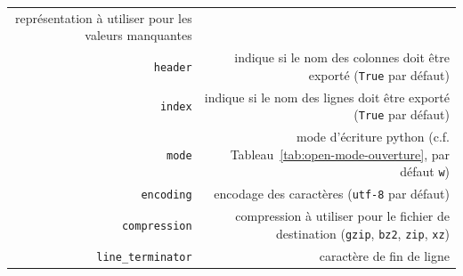 \documentclass[12pt,]{book}
\numberwithin{equation}{section}
\numberwithin{countremarque}{section}
\begin{document}
\begin{longtable}[]{@{}rr@{}}
\begin{minipage}[t]{0.67\columnwidth}
représentation à utiliser pour les valeurs manquantes\strut
\end{minipage}\tabularnewline
\begin{minipage}[t]{0.22\columnwidth}\raggedleft\strut
\texttt{header}\strut
\end{minipage} & \begin{minipage}[t]{0.67\columnwidth}\raggedleft\strut
indique si le nom des colonnes doit être exporté (\texttt{True} par
défaut)\strut
\end{minipage}\tabularnewline
\begin{minipage}[t]{0.22\columnwidth}\raggedleft\strut
\texttt{index}\strut
\end{minipage} & \begin{minipage}[t]{0.67\columnwidth}\raggedleft\strut
indique si le nom des lignes doit être exporté (\texttt{True} par
défaut)\strut
\end{minipage}\tabularnewline
\begin{minipage}[t]{0.22\columnwidth}\raggedleft\strut
\texttt{mode}\strut
\end{minipage} & \begin{minipage}[t]{0.67\columnwidth}\raggedleft\strut
mode d'écriture python (c.f. Tableau~\ref{tab:open-mode-ouverture}, par
défaut \texttt{w})\strut
\end{minipage}\tabularnewline
\begin{minipage}[t]{0.22\columnwidth}\raggedleft\strut
\texttt{encoding}\strut
\end{minipage} & \begin{minipage}[t]{0.67\columnwidth}\raggedleft\strut
encodage des caractères (\texttt{utf-8} par défaut)\strut
\end{minipage}\tabularnewline
\begin{minipage}[t]{0.22\columnwidth}\raggedleft\strut
\texttt{compression}\strut
\end{minipage} & \begin{minipage}[t]{0.67\columnwidth}\raggedleft\strut
compression à utiliser pour le fichier de destination (\texttt{gzip},
\texttt{bz2}, \texttt{zip}, \texttt{xz})\strut
\end{minipage}\tabularnewline
\begin{minipage}[t]{0.22\columnwidth}\raggedleft\strut
\texttt{line\_terminator}\strut
\end{minipage} & \begin{minipage}[t]{0.67\columnwidth}\raggedleft\strut
caractère de fin de ligne\strut
\end{minipage}\tabularnewline

\end{longtable}
\end{document}
